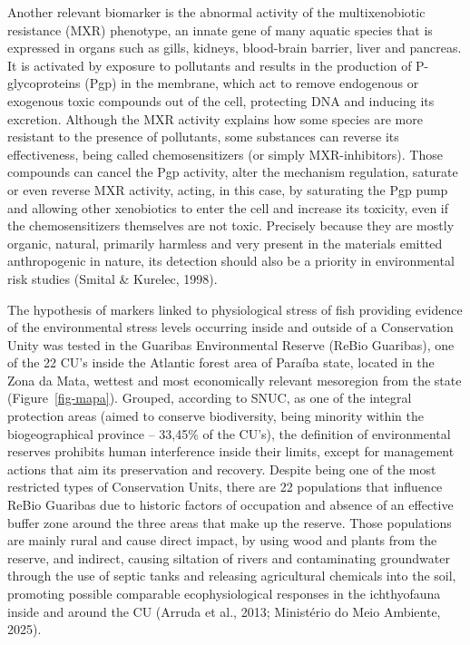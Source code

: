 \documentclass[
  american,
  letterpaper,
  DIV=11,
  numbers=noendperiod]{scrartcl}
\begin{document}
Another relevant biomarker is the abnormal activity of the
multixenobiotic resistance (MXR) phenotype, an innate gene of many
aquatic species that is expressed in organs such as gills, kidneys,
blood-brain barrier, liver and pancreas. It is activated by exposure to
pollutants and results in the production of P-glycoproteins (Pgp) in the
membrane, which act to remove endogenous or exogenous toxic compounds
out of the cell, protecting DNA and inducing its excretion. Although the
MXR activity explains how some species are more resistant to the
presence of pollutants, some substances can reverse its effectiveness,
being called chemosensitizers (or simply MXR-inhibitors). Those
compounds can cancel the Pgp activity, alter the mechanism regulation,
saturate or even reverse MXR activity, acting, in this case, by
saturating the Pgp pump and allowing other xenobiotics to enter the cell
and increase its toxicity, even if the chemosensitizers themselves are
not toxic. Precisely because they are mostly organic, natural, primarily
harmless and very present in the materials emitted anthropogenic in
nature, its detection should also be a priority in environmental risk
studies (Smital \& Kurelec, 1998).

The hypothesis of markers linked to physiological stress of fish
providing evidence of the environmental stress levels occurring inside
and outside of a Conservation Unity was tested in the Guaribas
Environmental Reserve (ReBio Guaribas), one of the 22 CU's inside the
Atlantic forest area of Paraíba state, located in the Zona da Mata,
wettest and most economically relevant mesoregion from the state
(Figure~\ref{fig-mapa}). Grouped, according to SNUC, as one of the
integral protection areas (aimed to conserve biodiversity, being
minority within the biogeographical province -- 33,45\% of the CU's),
the definition of environmental reserves prohibits human interference
inside their limits, except for management actions that aim its
preservation and recovery. Despite being one of the most restricted
types of Conservation Units, there are 22 populations that influence
ReBio Guaribas due to historic factors of occupation and absence of an
effective buffer zone around the three areas that make up the reserve.
Those populations are mainly rural and cause direct impact, by using
wood and plants from the reserve, and indirect, causing siltation of
rivers and contaminating groundwater through the use of septic tanks and
releasing agricultural chemicals into the soil, promoting possible
comparable ecophysiological responses in the ichthyofauna inside and
around the CU (Arruda et al., 2013; Ministério do Meio Ambiente, 2025).
\end{document}
